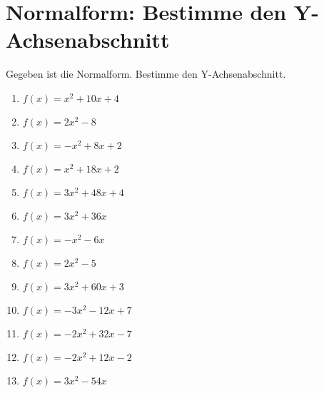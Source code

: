 \documentclass{article}%
\begin{document}
\section{Normalform: Bestimme den Y{-}Achsenabschnitt}%
\label{sec:NormalformBestimmedenY{-}Achsenabschnitt}%
Gegeben ist die Normalform. Bestimme den Y{-}Achsenabschnitt.%
\begin{enumerate}[label=\alph*)]%
\item%
\newline\vspace{0.5cm} $f(x)=x^2 + 10x + 4$%
\item%
\newline\vspace{0.5cm} $f(x)=2x^2 - 8$%
\item%
\newline\vspace{0.5cm} $f(x)=-x^2 + 8x + 2$%
\item%
\newline\vspace{0.5cm} $f(x)=x^2 + 18x + 2$%
\item%
\newline\vspace{0.5cm} $f(x)=3x^2 + 48x + 4$%
\item%
\newline\vspace{0.5cm} $f(x)=3x^2 + 36x$%
\item%
\newline\vspace{0.5cm} $f(x)=-x^2 - 6x$%
\item%
\newline\vspace{0.5cm} $f(x)=2x^2 - 5$%
\item%
\newline\vspace{0.5cm} $f(x)=3x^2 + 60x + 3$%
\item%
\newline\vspace{0.5cm} $f(x)=-3x^2 - 12x + 7$%
\item%
\newline\vspace{0.5cm} $f(x)=-2x^2 + 32x - 7$%
\item%
\newline\vspace{0.5cm} $f(x)=-2x^2 + 12x - 2$%
\item%
\newline\vspace{0.5cm} $f(x)=3x^2 - 54x$%

\end{enumerate}
\end{document}
